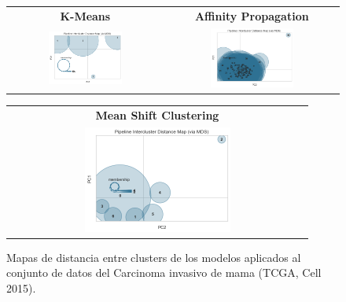 \begin{figure} 
	\setlength\tabcolsep{3pt}%
	\centering
	\caption{Mapas de distancia entre clusters de los modelos aplicados al conjunto de datos del Carcinoma invasivo de mama (TCGA, Cell 2015).}
	\label{distance}
	\begin{tabular}{|c|c|}
		\hline
		\textbf{K-Means} &
		\textbf{Affinity Propagation} \\
		\includegraphics[width=0.5\textwidth]{NOTEBOOK/IMAGENES_CLUSTERING/1_MAP_Kmeans} &
		\includegraphics[width=0.5\textwidth]{NOTEBOOK/IMAGENES_CLUSTERING/2_MAP_Affinity_Propagation} 
		\\ \hline
	\end{tabular}
	\begin{tabular}{|c|}
		\hline
		\textbf{Mean Shift Clustering} \\
		\includegraphics[width=0.5\textwidth]{NOTEBOOK/IMAGENES_CLUSTERING/3_MAP_Meanshift_Distance}
		\\ \hline
	\end{tabular}
\end{figure}


